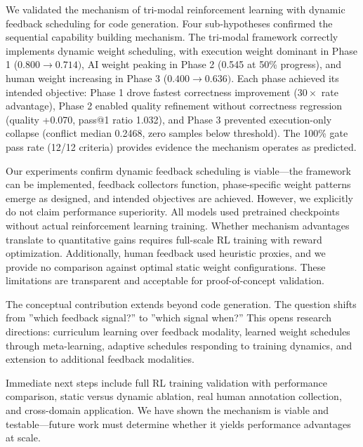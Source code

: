 
We validated the mechanism of tri-modal reinforcement learning with dynamic feedback scheduling for code generation. Four sub-hypotheses confirmed the sequential capability building mechanism. The tri-modal framework correctly implements dynamic weight scheduling, with execution weight dominant in Phase 1 (0.$800\rightarrow 0.714)$, AI weight peaking in Phase 2 (0.545 at 50\% progress), and human weight increasing in Phase 3 (0.$400\rightarrow 0.636)$. Each phase achieved its intended objective: Phase 1 drove fastest correctness improvement ($30\times$ rate advantage), Phase 2 enabled quality refinement without correctness regression (quality +0.070, pass@1 ratio 1.032), and Phase 3 prevented execution-only collapse (conflict median 0.2468, zero samples below threshold). The 100\% gate pass rate (12/12 criteria) provides evidence the mechanism operates as predicted.

Our experiments confirm dynamic feedback scheduling is viable---the framework can be implemented, feedback collectors function, phase-specific weight patterns emerge as designed, and intended objectives are achieved. However, we explicitly do not claim performance superiority. All models used pretrained checkpoints without actual reinforcement learning training. Whether mechanism advantages translate to quantitative gains requires full-scale RL training with reward optimization. Additionally, human feedback used heuristic proxies, and we provide no comparison against optimal static weight configurations. These limitations are transparent and acceptable for proof-of-concept validation.

The conceptual contribution extends beyond code generation. The question shifts from ''which feedback signal?'' to ''which signal when?'' This opens research directions: curriculum learning over feedback modality, learned weight schedules through meta-learning, adaptive schedules responding to training dynamics, and extension to additional feedback modalities.

Immediate next steps include full RL training validation with performance comparison, static versus dynamic ablation, real human annotation collection, and cross-domain application. We have shown the mechanism is viable and testable---future work must determine whether it yields performance advantages at scale.
